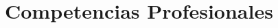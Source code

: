 \documentclass[11pt,a4paper,roman]{moderncv}        %
\begin{document}
	
	
	
	
	
	
	
	
	
	
	
	
	\section{Competencias Profesionales}
	
	\vspace{6pt}
	
\end{document}
